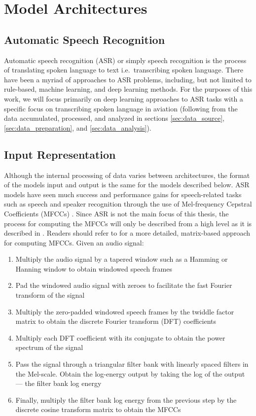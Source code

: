 \documentclass[12pt]{article}
\begin{document}
\section{Model Architectures}

\subsection{Automatic Speech Recognition}\label{sec:automatic_speech_recognition}
Automatic speech recognition (ASR) or simply speech recognition is the process of translating spoken language to text i.e.~transcribing spoken
language. There have been a myriad of approaches to ASR problems, including, but not limited to rule-based, machine learning, and deep learning
methods. For the purposes of this work, we will focus primarily on deep learning approaches to ASR tasks with a specific focus on transcribing
spoken language in aviation (following from the data accumulated, processed, and analyzed in sections \ref{sec:data_source},
\ref{sec:data_preparation}, and \ref{sec:data_analysis}).

\subsection{Input Representation}\label{sec:asr_input_representation}
Although the internal processing of data varies between architectures, the format of the models input and output is the same for the models described
below. ASR models have seen much success and performance gains for speech-related tasks such as speech and speaker recognition through the use of
Mel-frequency Cepstral Coefficients (MFCCs) \cite{sahidullah_design_2012}. Since ASR is not the main focus of this thesis, the process for computing
the MFCCs will only be described from a high level as it is described in \cite{sahidullah_design_2012}. Readers should refer to
\cite{sahidullah_design_2012} for a more detailed, matrix-based approach for computing MFCCs. Given an audio signal:

\begin{enumerate}
    \item Multiply the audio signal by a tapered window such as a Hamming or Hanning window to obtain windowed speech frames
    \item Pad the windowed audio signal with zeroes to facilitate the fast Fourier transform of the signal
    \item Multiply the zero-padded windowed speech frames by the twiddle factor matrix to obtain the discrete Fourier transform (DFT) coefficients
    \item Multiply each DFT coefficient with its conjugate to obtain the power spectrum of the signal
    \item Pass the signal through a triangular filter bank with linearly spaced filters in the Mel-scale. Obtain the log-energy output by taking the
          log of the output --- the filter bank log energy
    \item Finally, multiply the filter bank log energy from the previous step by the discrete cosine transform matrix to obtain the MFCCs
\end{enumerate}
\end{document}
